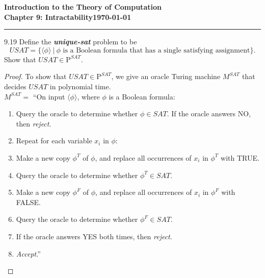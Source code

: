 \documentclass[11pt]{article}
\newcommand{\dated}{\today}
\begin{document}
\textbf{Introduction to the Theory of
Computation}\hfill\textbf{\myname}\\[0.01in]
\textbf{Chapter 9: Intractability}\hfill\textbf{\dated}\\
\smallskip\hrule\bigskip

\begin{problem}{9.19}
Define the \textit{\textbf{unique-sat}} problem to be
\[
USAT = \{\langle \phi \rangle \ | \ \phi \text{ is a Boolean formula that has a single satisfying assignment}\}.
\]
Show that $USAT \in \text{P}^{SAT}$.
\end{problem}

\begin{proof}
To show that $USAT \in \text{P}^{SAT}$, we give an oracle Turing machine $M^{SAT}$ that decides $USAT$ in polynomial time. \\

$M^{SAT} =$ \textquotedblleft On input $\langle \phi \rangle$, where $\phi$ is a Boolean formula:
\begin{enumerate}
\item Query the oracle to determine whether $\phi \in SAT$. If the oracle answers NO, then \textit{reject}.
\item Repeat for each variable $x_i$ in $\phi$:
\item \hspace*{0.5cm} Make a new copy $\phi^T$ of $\phi$, and replace all occurrences of $x_i$ in $\phi^T$ with TRUE.
\item \hspace*{0.5cm} Query the oracle to determine whether $\phi^T \in SAT$.
\item \hspace*{0.5cm} Make a new copy $\phi^F$ of $\phi$, and replace all occurrences of $x_i$ in $\phi^F$ with FALSE.
\item \hspace*{0.5cm} Query the oracle to determine whether $\phi^F \in SAT$.
\item \hspace*{0.5cm} If the oracle answers YES both times, then \textit{reject}.
\item \textit{Accept}.\textquotedblright
\end{enumerate}

\end{proof}
\end{document}
